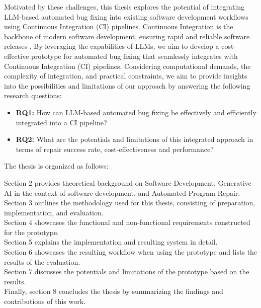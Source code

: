 Motivated by these challenges, this thesis explores the potential of integrating LLM-based automated bug fixing into existing software development workflows using Continuous Integration (CI) pipelines. Continuous Integration is the backbone of modern software development, ensuring rapid and reliable software releases \cite{ugwuezeContinuousIntegrationDeployment2024}. By leveraging the capabilities of LLMs, we aim to develop a cost-effective prototype for automated bug fixing that seamlessly integrates with Continuous Integration (CI) pipelines. Considering computational demands, the complexity of integration, and practical constraints, we aim to provide insights into the possibilities and limitations of our approach by answering the following research questions:

\vspace{1em}

\begin{itemize}
    \item \textbf{RQ1:} How can LLM-based automated bug fixing be effectively and efficiently integrated into a CI pipeline?
    \item \textbf{RQ2:} What are the potentials and limitations of this integrated approach in terms of repair success rate, cost-effectiveness and performance?
\end{itemize}

The thesis is organized as follows:

Section 2 provides theoretical background on Software Development, Generative AI in the context of software development, and Automated Program Repair.\\
Section 3 outlines the methodology used for this thesis, consisting of preparation, implementation, and evaluation.\\
Section 4 showcases the functional and non-functional requirements constructed for the prototype.\\
Section 5 explains the implementation and resulting system in detail.\\
Section 6 showcases the resulting workflow when using the prototype and lists the results of the evaluation.\\
Section 7 discusses the potentials and limitations of the prototype based on the results.\\
Finally, section 8 concludes the thesis by summarizing the findings and contributions of this work.
